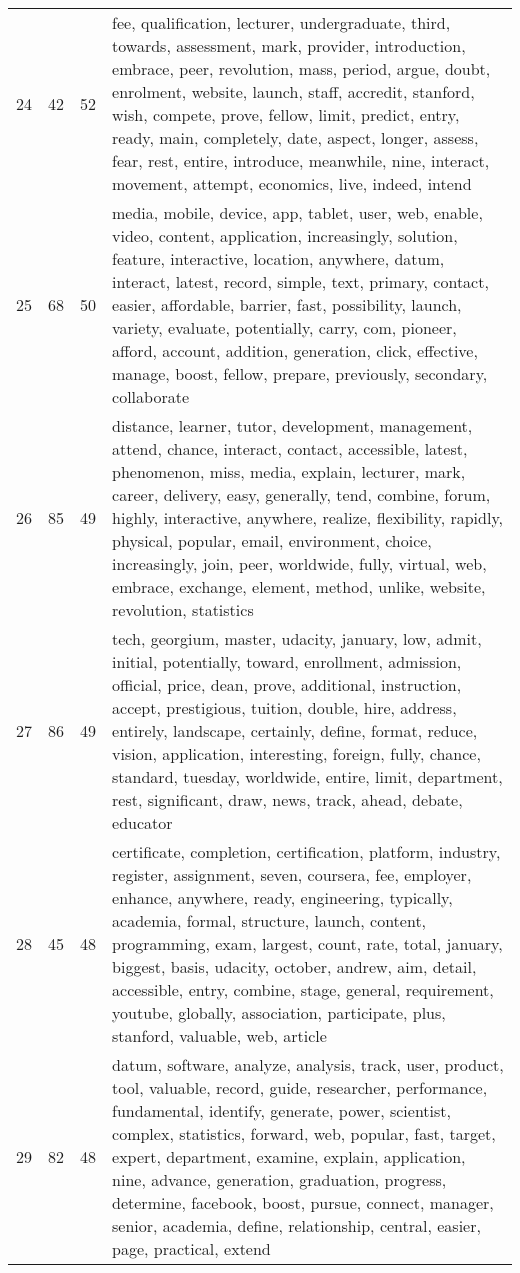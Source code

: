 \begin{table}[ht]
{\begin{tabularx}{\textwidth}{llrX}
   24 & 42 & 52 & fee, qualification, lecturer, undergraduate, third, towards, assessment, mark, provider, introduction, embrace, peer, revolution, mass, period, argue, doubt, enrolment, website, launch, staff, accredit, stanford, wish, compete, prove, fellow, limit, predict, entry, ready, main, completely, date, aspect, longer, assess, fear, rest, entire, introduce, meanwhile, nine, interact, movement, attempt, economics, live, indeed, intend \\ 
   25 & 68 & 50 & media, mobile, device, app, tablet, user, web, enable, video, content, application, increasingly, solution, feature, interactive, location, anywhere, datum, interact, latest, record, simple, text, primary, contact, easier, affordable, barrier, fast, possibility, launch, variety, evaluate, potentially, carry, com, pioneer, afford, account, addition, generation, click, effective, manage, boost, fellow, prepare, previously, secondary, collaborate \\ 
   26 & 85 & 49 & distance, learner, tutor, development, management, attend, chance, interact, contact, accessible, latest, phenomenon, miss, media, explain, lecturer, mark, career, delivery, easy, generally, tend, combine, forum, highly, interactive, anywhere, realize, flexibility, rapidly, physical, popular, email, environment, choice, increasingly, join, peer, worldwide, fully, virtual, web, embrace, exchange, element, method, unlike, website, revolution, statistics \\ 
   27 & 86 & 49 & tech, georgium, master, udacity, january, low, admit, initial, potentially, toward, enrollment, admission, official, price, dean, prove, additional, instruction, accept, prestigious, tuition, double, hire, address, entirely, landscape, certainly, define, format, reduce, vision, application, interesting, foreign, fully, chance, standard, tuesday, worldwide, entire, limit, department, rest, significant, draw, news, track, ahead, debate, educator \\ 
   28 & 45 & 48 & certificate, completion, certification, platform, industry, register, assignment, seven, coursera, fee, employer, enhance, anywhere, ready, engineering, typically, academia, formal, structure, launch, content, programming, exam, largest, count, rate, total, january, biggest, basis, udacity, october, andrew, aim, detail, accessible, entry, combine, stage, general, requirement, youtube, globally, association, participate, plus, stanford, valuable, web, article \\ 
   29 & 82 & 48 & datum, software, analyze, analysis, track, user, product, tool, valuable, record, guide, researcher, performance, fundamental, identify, generate, power, scientist, complex, statistics, forward, web, popular, fast, target, expert, department, examine, explain, application, nine, advance, generation, graduation, progress, determine, facebook, boost, pursue, connect, manager, senior, academia, define, relationship, central, easier, page, practical, extend \\ 

\end{tabularx}}
\end{table}
